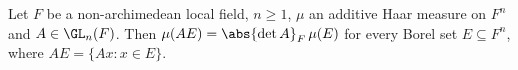 Let $F$ be a non-archimedean local field, $n\ge1$, $\mu$ an additive Haar measure on $F^n$ and $A\in\GL_n(F)$. Then
$\mu(AE)=\abs{\det A}_F\,\mu(E)$ for every Borel set $E\subseteq F^n$, where $AE=\{Ax:x\in E\}$.
